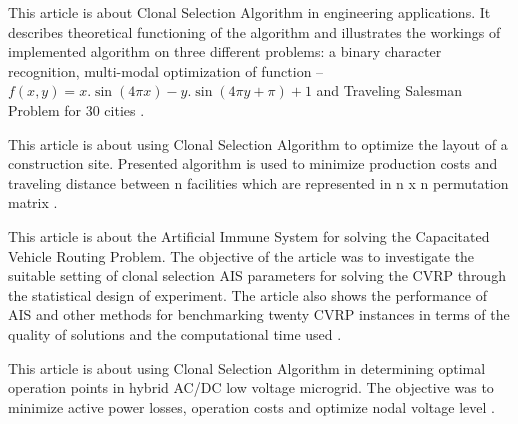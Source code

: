 \documentclass[a4paper]{article}
\begin{document}
This article is about Clonal Selection Algorithm in engineering applications. It describes theoretical functioning of the algorithm and illustrates the workings of implemented algorithm on three different problems: a binary character recognition, multi-modal optimization of function – 
$f(x, y) = x.\sin(4 \pi x) - y.\sin(4 \pi y + \pi) + 1$
and Traveling Salesman Problem for 30 cities \cite{de_castro}.


This article is about using Clonal Selection Algorithm to optimize the layout of a construction site. Presented algorithm is used to minimize production costs and traveling distance between n facilities which are represented in n x n permutation matrix \cite{WANG2016267}.


This article is about the Artificial Immune System for solving the Capacitated Vehicle Routing Problem. The objective of the article was to investigate the suitable setting of clonal selection AIS parameters for solving the CVRP through the statistical design of experiment. The article also shows the performance of AIS and other methods for benchmarking twenty CVRP instances in terms of the quality of solutions and the computational time used \cite{thapatsuwan}.


This article is about using Clonal Selection Algorithm in determining optimal operation points in hybrid AC/DC low voltage microgrid. The objective was to minimize active power losses, operation costs and optimize nodal voltage level \cite{rokicki}.
\newpage
\printbibliography
\end{document}

